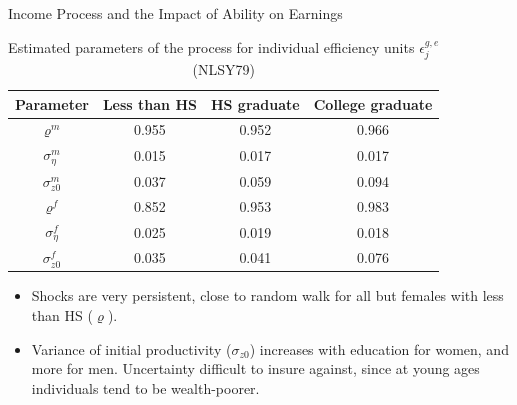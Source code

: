 \documentclass{beamer}
\begin{document}
\begin{frame}[label=Income2]{Income Process and the Impact of Ability on Earnings}
\hyperlink{Return4}{}

\begin {table}[H]
\caption {Estimated parameters of the process for individual efficiency units $\epsilon_j^{g,e}$
 (NLSY79)} \label{tab:title} 
\begin{center}
  \begin{tabular}{c | c | c | c }
      \hline
  Parameter & Less than HS & HS graduate & College graduate  \\ \hline
 $\varrho^m$  &  0.955 & 0.952 & 0.966  \\ 
  $\sigma_{\eta}^{m}$  & 0.015  & 0.017& 0.017 \\ 
   $\sigma_{z0}^{m}$  & 0.037& 0.059 & 0.094  \\ \hline
      $\varrho^{f}$  & 0.852  & 0.953 &  0.983\\ 
   $\sigma_{\eta}^{f}$  &  0.025& 0.019& 0.018  \\ 
   $\sigma_{z0}^{f}$  & 0.035 & 0.041 & 0.076   \\ 

              \hline
  \end{tabular}
\end{center}
\end {table}

\begin{itemize}
\item Shocks are very persistent, close to random walk for all but females with less than HS ($\varrho$).
\item Variance of initial productivity ($\sigma_{z0}$) increases with education for women, and more for men. Uncertainty difficult to insure against, since at young ages individuals tend to be wealth-poorer. %

\end{itemize}
\end{frame}
\end{document}
